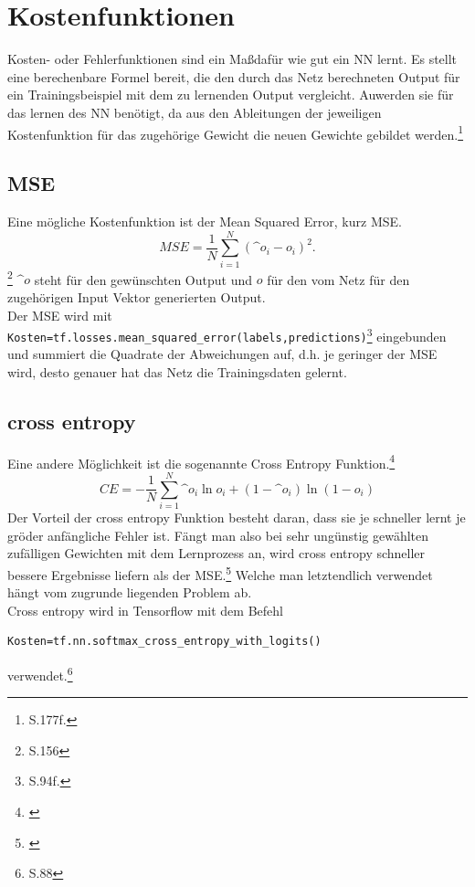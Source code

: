 \section{Kostenfunktionen}
Kosten- oder Fehlerfunktionen sind ein Ma\ss daf\"ur wie gut ein \gls{NN} lernt. Es stellt eine berechenbare Formel bereit, die den durch das Netz berechneten Output f\"ur ein Trainingsbeispiel mit dem zu lernenden Output vergleicht. Au\sserdem werden sie f\"ur das lernen des \gls{NN} ben\"otigt, da aus den Ableitungen der jeweiligen Kostenfunktion f\"ur das zugeh\"orige Gewicht die neuen Gewichte gebildet werden.\footnote{\cite{Goodfellow}S.177f.}
\subsection{MSE}
Eine m\"ogliche Kostenfunktion ist der Mean Squared Error, kurz MSE.
\begin{equation}
MSE=\frac{1}{N}\sum_{i=1}^{N} (\^{o}_i-o_i)^2.
\end{equation}\footnote{\cite{Rojas1996}S.156}
$\^{o}$ steht f\"ur den gew\"unschten Output und $o$ f\"ur den vom Netz f\"ur den zugeh\"origen Input Vektor generierten Output.\\
Der MSE wird mit  \lstinline$Kosten=tf.losses.mean_squared_error(labels,predictions)$\footnote{\cite{cookbook}S.94f.} eingebunden und summiert die Quadrate der Abweichungen auf, d.h. je geringer der MSE wird, desto genauer hat das Netz die Trainingsdaten gelernt.
\subsection{cross entropy}
Eine andere M\"oglichkeit ist die sogenannte Cross Entropy Funktion.\footnote{\cite{Nielsen}}
\begin{equation}
CE= - \frac{1}{N} \sum_{i=1}^{N}\^{o}_i \ln o_i + (1- \^{o}_i) \ln (1-o_i)
\end{equation}
Der Vorteil der cross entropy Funktion besteht daran, dass sie je schneller lernt je gr\"o\sser der anf\"angliche Fehler ist. F\"angt man also bei sehr ung\"unstig gew\"ahlten zuf\"alligen Gewichten mit dem Lernprozess an, wird cross entropy schneller bessere Ergebnisse liefern als der MSE.\footnote{\cite{Nielsen}} Welche man letztendlich verwendet h\"angt vom zugrunde liegenden Problem ab.\\
Cross entropy wird in Tensorflow mit dem Befehl 
\begin{lstlisting}
Kosten=tf.nn.softmax_cross_entropy_with_logits()
\end{lstlisting}verwendet.\footnote{\cite{cookbook}S.88}

